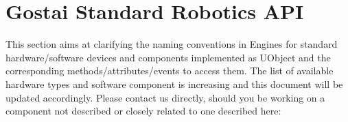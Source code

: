 \newcommand{\reqSlot}[2]{%
  \lstindex{#1} & #2 \\\hline%
}%

\newcommand{\optSlot}[2]{%
  \cellcolor{verylightgray}[\lstindex{#1}] & #2 \\\hline%
}%

\newenvironment{slotsOrEvents}[1]
{%
  \tablehead{%
    \hline%
    \textbf{#1} &%
    \textbf{Description}\\\hline%
  }%
  \begin{supertabular}{|m{.15\textwidth}|m{.8\textwidth}|}%
  }{%
  \end{supertabular}%
}

\newenvironment{slots}
{%
  \begin{slotsOrEvents}{Slot}%
  }{%
  \end{slotsOrEvents}%
}

\newenvironment{events}
{%
  \begin{slotsOrEvents}{Event}%
  }{%
  \end{slotsOrEvents}%
}

\newcommand{\refFacet}[2][]%
  {\hyperref[sec:interface:#2]{\lstinline|#2|#1 (\autoref*{sec:interface:#2})}}

\newcommand{\interface}[2][]{%
  \ifthenelse{\equal{#1}{}}{%
    \subsection{#2\index{#2@\lstinline{#2}}}%
  }{%
    \subsection{#2 (subclass of #1)\index{#2@\lstinline{#2}}}%
  }%
  \label{sec:interface:#2}
}

\newcommand{\gsrapi}{Gostai Standard Robotics API\xspace}
\chapter{Gostai Standard Robotics API}
\label{sec:naming}


This section aims at clarifying the naming conventions in \urbi
Engines for standard hardware/software devices and components
implemented as UObject and the corresponding methods/attributes/events
to access them. The list of available hardware types and software
component is increasing and this document will be updated
accordingly. Please contact us directly, should you be working on a
component not described or closely related to one described here:

